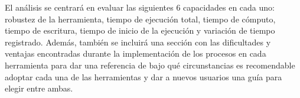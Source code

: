 El análisis se centrará en evaluar las siguientes 6 capacidades en cada uno: robustez de la herramienta, tiempo de ejecución total, tiempo de cómputo, tiempo de escritura, tiempo de inicio de la ejecución y variación de tiempo registrado. Además, también se incluirá una sección con las dificultades y ventajas encontradas durante la implementación de los procesos en cada herramienta para dar una referencia de bajo qué circunstancias es recomendable adoptar cada una de las herramientas y dar a nuevos usuarios una guía para elegir entre ambas. 

